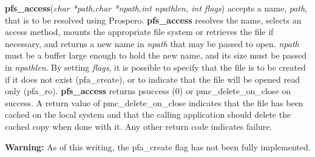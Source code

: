 {\bf pfs\_access}({\it char *path,char *npath,int npathlen, int
flags}) accepts a name, {\it path}, that is to be resolved using
Prospero.  {\bf pfs\_access} resolves the name, selects an access
method, mounts the appropriate file system or retrieves the file if
necessary, and returns a new name in {\it npath} that may be passed to
open.  {\it npath} must be a buffer large enough to hold the new name,
and its size must be passed in {\it npathlen}.  By setting {\it
flags}, it is possible to specify that the file is to be created if it
does not exist ({\sc pfa\_create}), or to indicate that the file will
be opened read only ({\sc pfa\_ro}). {\bf pfs\_access} returns {\sc
psuccess} (0) or {\sc pmc\_delete\_on\_close} on success.  A return
value of {\sc pmc\_delete\_on\_close} indicates that the file has been
cached on the local system and that the calling application should
delete the cached copy when done with it.  Any other return code
indicates failure.

{\bf Warning:} As of this writing, the {\sc pfa\_create} flag has not
been fully implemented.  


